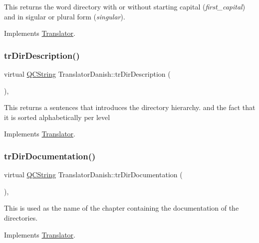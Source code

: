 This returns the word directory with or without starting capital ({\itshape first\+\_\+capital}) and in sigular or plural form ({\itshape singular}). 

Implements \mbox{\hyperlink{class_translator}{Translator}}.

\mbox{\label{class_translator_danish_a1139152252f6ee748f8e7b4705987b16}} 
\subsubsection{\texorpdfstring{trDirDescription()}{trDirDescription()}}
{\footnotesize\ttfamily virtual \mbox{\hyperlink{class_q_c_string}{Q\+C\+String}} Translator\+Danish\+::tr\+Dir\+Description (\begin{DoxyParamCaption}{ }\end{DoxyParamCaption})\hspace{0.3cm}{\ttfamily [inline]}, {\ttfamily [virtual]}}

This returns a sentences that introduces the directory hierarchy. and the fact that it is sorted alphabetically per level 

Implements \mbox{\hyperlink{class_translator}{Translator}}.

\mbox{\label{class_translator_danish_a879da65e434991246126ca67ed49fbb2}} 
\subsubsection{\texorpdfstring{trDirDocumentation()}{trDirDocumentation()}}
{\footnotesize\ttfamily virtual \mbox{\hyperlink{class_q_c_string}{Q\+C\+String}} Translator\+Danish\+::tr\+Dir\+Documentation (\begin{DoxyParamCaption}{ }\end{DoxyParamCaption})\hspace{0.3cm}{\ttfamily [inline]}, {\ttfamily [virtual]}}

This is used as the name of the chapter containing the documentation of the directories. 

Implements \mbox{\hyperlink{class_translator}{Translator}}.

